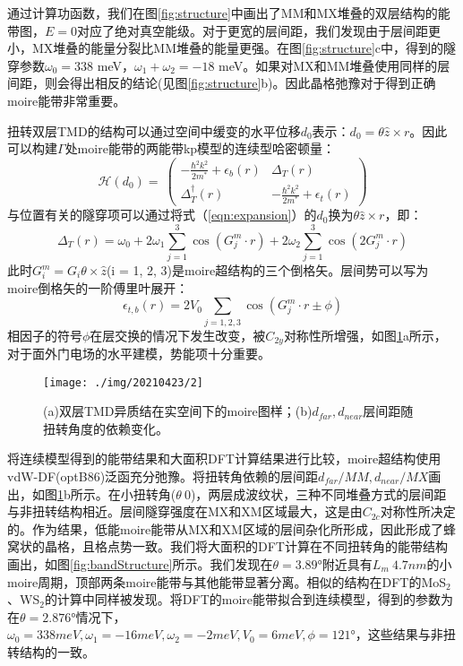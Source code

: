 \documentclass[reprint, aps, prb, showkeys]{revtex4-2}
\begin{document}
通过计算功函数，我们在图\ref{fig:structure}中画出了MM和MX堆叠的双层结构的能带图，$E = 0$对应了绝对真空能级。对于更宽的层间距，我们发现由于层间距更小，MX堆叠的能量分裂比MM堆叠的能量更强。在图\ref{fig:structure}c中，得到的隧穿参数$\omega_0 = 338$ meV，$\omega_1 + \omega_2 = -18$ meV。如果对MX和MM堆叠使用同样的层间距，则会得出相反的结论(见图\ref{fig:structure}b)。因此晶格弛豫对于得到正确moire能带非常重要。

扭转双层TMD的结构可以通过空间中缓变的水平位移$d_0$表示：$d_0 = \theta \widehat{z} \times r$。因此可以构建$\Gamma$处moire能带的两能带kp模型的连续型哈密顿量：
\begin{equation}
    \mathcal{H}(d_0) = \
    \begin{pmatrix}
        -\frac{\hbar^2 k^2}{2m^{*}} + \epsilon_b(r)& \Delta_T(r) \\
        \Delta_T^{\dagger}(r)& -\frac{\hbar^2 k^2}{2m^{*}} + \epsilon_t(r)
    \end{pmatrix}
\end{equation}
与位置有关的隧穿项可以通过将式（\ref{eqn:expansion}）的$d_0$换为$\theta \widehat{z} \times r$，即：
\begin{equation}
    \Delta_T(r) = \omega_0 + 2\omega_1 \sum_{j = 1}^3 \cos (G_j^m \cdot r) + 2\omega_2 \sum_{j = 1}^3 \cos (2G_j^m \cdot r) \label{eqn:expansionInR}
\end{equation}
此时$G_i^m = G_i \theta \times \widehat{z}$(i = 1, 2, 3)是moire超结构的三个倒格矢。层间势可以写为moire倒格矢的一阶傅里叶展开：
\begin{equation}
    \epsilon_{t,b}(r) = 2V_0 \sum_{j = 1, 2, 3} \cos \left( G_j^m \cdot r \pm \phi \right)
\end{equation}
相因子的符号$\phi$在层交换的情况下发生改变，被$C_{2y}$对称性所增强，如图\ref{fig:moirePattern}a所示，对于面外门电场的水平建模，势能项十分重要。
\begin{figure}[t]
    \texttt{[image: ./img/20210423/2]}
    \caption{\label{fig:moirePattern} 
    (a)双层TMD异质结在实空间下的moire图样；(b)$d_{far}, d_{near}$层间距随扭转角度的依赖变化。
    }
\end{figure}
将连续模型得到的能带结果和大面积DFT计算结果进行比较，moire超结构使用vdW-DF(optB86)泛函充分弛豫。将扭转角依赖的层间距$d_{far}/ MM, d_{near}/MX$画出，如图\ref{fig:moirePattern}b所示。在小扭转角($\theta ~ 0$)，两层成波纹状，三种不同堆叠方式的层间距与非扭转结构相近。层间隧穿强度在MX和XM区域最大，这是由$C_{2c}$对称性所决定的。作为结果，低能moire能带从MX和XM区域的层间杂化所形成，因此形成了蜂窝状的晶格，且格点势一致。我们将大面积的DFT计算在不同扭转角的能带结构画出，如图\ref{fig:bandStructure}所示。我们发现在$\theta = 3.89°$附近具有$L_m ~ 4.7 nm$的小moire周期，顶部两条moire能带与其他能带显著分离。相似的结构在DFT的MoS$_2$、WS$_2$的计算中同样被发现。将DFT的moire能带拟合到连续模型，得到的参数为在$\theta = 2.876°$情况下，$\omega_0 = 338 meV, \omega_1 = -16 meV, \omega_2 = -2 meV, V_0 = 6 meV, \phi = 121°$，这些结果与非扭转结构的一致。
\end{document}
